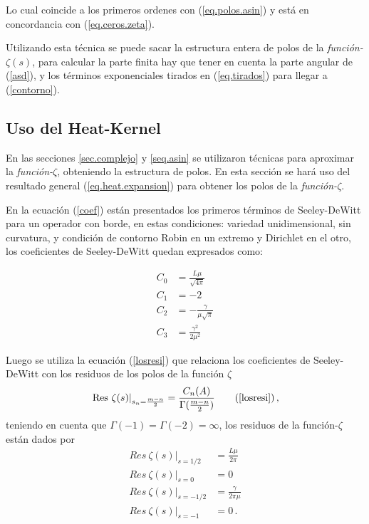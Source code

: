 Lo cual coincide a los primeros ordenes con (\ref{eq.polos.asin}) y está en concordancia  con (\ref{eq.ceros.zeta}).

Utilizando esta técnica se puede sacar la estructura entera de polos de la {\it función-$\zeta (s)$}, para calcular la parte finita hay que tener en cuenta la parte angular de (\ref{asd}), y los términos exponenciales tirados en (\ref{eq.tirados}) para llegar a (\ref{contorno}).


\subsection{Uso del Heat-Kernel}

En las secciones \ref{sec.complejo} y \ref{seq.asin} se utilizaron técnicas para aproximar la {\it función-$\zeta$}, obteniendo la estructura de polos. En esta sección se hará uso del resultado general (\ref{eq.heat.expansion}) para obtener los polos de la {\it función-$\zeta$}.

En la ecuación (\ref{coef}) están presentados los primeros términos de Seeley-DeWitt para un operador con borde, en estas condiciones: variedad unidimensional, sin curvatura, y condición de contorno Robin en un extremo y Dirichlet en el otro, los coeficientes de Seeley-DeWitt quedan expresados como:


\begin{equation}
\begin{aligned}
C _0 &=  \frac{L \mu}{\sqrt{4 \pi} }\\
C _1 &=  -2 \\
C _2 &= - \frac{\gamma}{\mu \sqrt{\pi} } \\
C _3 &= \frac{ \gamma ^2 }{2 \mu ^2 }
\end{aligned}
\end{equation}


Luego se utiliza la ecuación (\ref{losresi}) que relaciona los coeficientes de Seeley-DeWitt con los residuos de los polos de la función $\zeta$
\begin{equation}
\left. {\rm Res} \ \zeta  (s)  \right| _{s_n= \frac{m - n}{2}} =  
\frac{ C_n  (A) }{ {\Gamma ( \frac{m-n}{2}} ) }
\tag{\ref{losresi}}
\, ,
\end{equation}
teniendo en cuenta que $\Gamma (-1) = \Gamma (-2) = \infty$, los residuos de la función-$\zeta$ están dados por
\begin{equation}
\begin{aligned}
Res \  \zeta  (s)  | _{s=1/2} &= \frac{L \mu}{2 \pi} \\[5pt]
Res \  \zeta  (s)  | _{s=0} &= 0 \\[5pt]
Res \ \zeta (s) | _{s=-1/2} &= \frac{\gamma}{2 \pi \mu} \\[5pt]
Res \  \zeta  (s) | _{s=-1} &= 0 \, . \\[5pt]
\end{aligned}
\end{equation}


